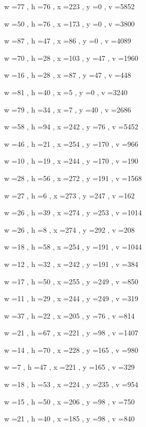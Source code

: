 \documentclass[11pt]{article}
\begin{document}
w =77 , h =76 , x =223 , y =0 , v =5852
\par
w =50 , h =76 , x =173 , y =0 , v =3800
\par
w =87 , h =47 , x =86 , y =0 , v =4089
\par
w =70 , h =28 , x =103 , y =47 , v =1960
\par
w =16 , h =28 , x =87 , y =47 , v =448
\par
w =81 , h =40 , x =5 , y =0 , v =3240
\par
w =79 , h =34 , x =7 , y =40 , v =2686
\par
w =58 , h =94 , x =242 , y =76 , v =5452
\par
w =46 , h =21 , x =254 , y =170 , v =966
\par
w =10 , h =19 , x =244 , y =170 , v =190
\par
w =28 , h =56 , x =272 , y =191 , v =1568
\par
w =27 , h =6 , x =273 , y =247 , v =162
\par
w =26 , h =39 , x =274 , y =253 , v =1014
\par
w =26 , h =8 , x =274 , y =292 , v =208
\par
w =18 , h =58 , x =254 , y =191 , v =1044
\par
w =12 , h =32 , x =242 , y =191 , v =384
\par
w =17 , h =50 , x =255 , y =249 , v =850
\par
w =11 , h =29 , x =244 , y =249 , v =319
\par
w =37 , h =22 , x =205 , y =76 , v =814
\par
w =21 , h =67 , x =221 , y =98 , v =1407
\par
w =14 , h =70 , x =228 , y =165 , v =980
\par
w =7 , h =47 , x =221 , y =165 , v =329
\par
w =18 , h =53 , x =224 , y =235 , v =954
\par
w =15 , h =50 , x =206 , y =98 , v =750
\par
w =21 , h =40 , x =185 , y =98 , v =840
\par
\newpage
\end{document}
